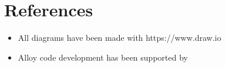 \chapter{References}
\begin{itemize}
    \item All diagrams have been made with https://www.draw.io
    \item Alloy code development has been supported by 
\end{itemize}
